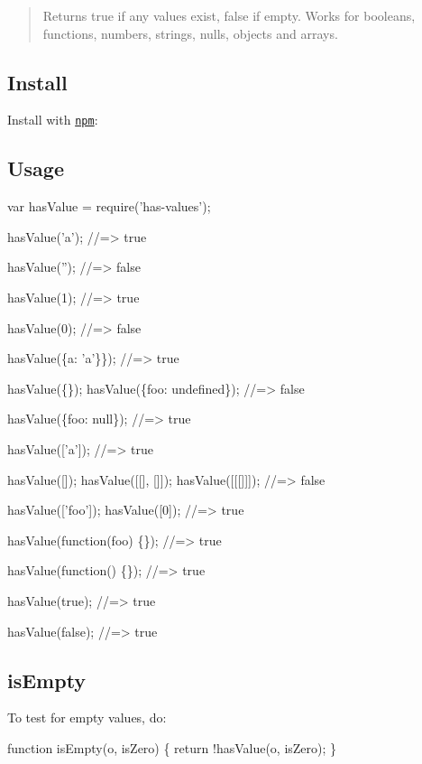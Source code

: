 \begin{quote}
Returns true if any values exist, false if empty. Works for booleans, functions, numbers, strings, nulls, objects and arrays. \end{quote}


\subsection*{Install}

Install with \href{https://www.npmjs.com/}{\tt npm}\+:




\subsection*{Usage}


\begin{DoxyCode}
var hasValue = require('has-values');

hasValue('a');
//=> true

hasValue('');
//=> false

hasValue(1);
//=> true

hasValue(0);
//=> false

hasValue(\{a: 'a'\}\});
//=> true

hasValue(\{\});
hasValue(\{foo: undefined\});
//=> false

hasValue(\{foo: null\});
//=> true

hasValue(['a']);
//=> true

hasValue([]);
hasValue([[], []]);
hasValue([[[]]]);
//=> false

hasValue(['foo']);
hasValue([0]);
//=> true

hasValue(function(foo) \{\}); 
//=> true

hasValue(function() \{\});
//=> true

hasValue(true);
//=> true

hasValue(false);
//=> true
\end{DoxyCode}


\subsection*{is\+Empty}

To test for empty values, do\+:


\begin{DoxyCode}
function isEmpty(o, isZero) \{
  return !hasValue(o, isZero);
\}
\end{DoxyCode}


